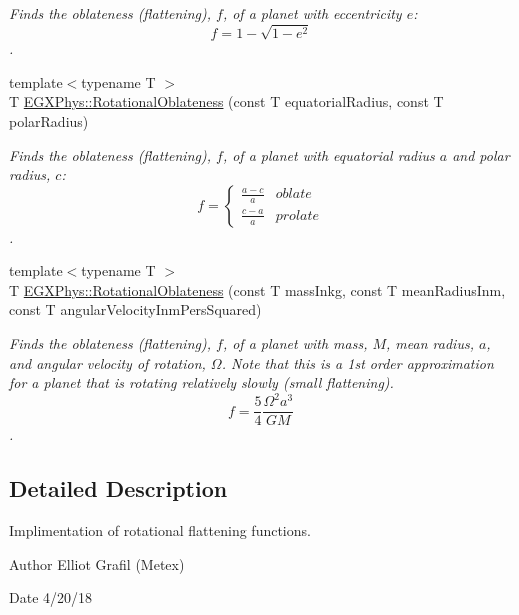 \begin{DoxyCompactItemize}
\begin{DoxyCompactList}\small\item\em Finds the oblateness (flattening), $f$, of a planet with eccentricity $e$\+: \[ f = 1 - \sqrt{1-e^2} \]. \end{DoxyCompactList}\item 
{\footnotesize template$<$typename T $>$ }\\T \mbox{\hyperlink{group___e_g_x_phys-_astrophysics-_rotational_flattening_ga0bbe606845430e58be5ed34541835f83}{E\+G\+X\+Phys\+::\+Rotational\+Oblateness}} (const T equatorial\+Radius, const T polar\+Radius)
\begin{DoxyCompactList}\small\item\em Finds the oblateness (flattening), $f$, of a planet with equatorial radius $a$ and polar radius, $c$\+: \[ f =\begin{cases} \frac{a-c}{a}{} & oblate \\ \frac{c-a}{a} & prolate \end{cases} \]. \end{DoxyCompactList}\item 
{\footnotesize template$<$typename T $>$ }\\T \mbox{\hyperlink{group___e_g_x_phys-_astrophysics-_rotational_flattening_ga7d78d01c8b3e1a9b2e4f17cb67969a88}{E\+G\+X\+Phys\+::\+Rotational\+Oblateness}} (const T mass\+Inkg, const T mean\+Radius\+Inm, const T angular\+Velocity\+Inm\+Pers\+Squared)
\begin{DoxyCompactList}\small\item\em Finds the oblateness (flattening), $f$, of a planet with mass, $M$, mean radius, $a$, and angular velocity of rotation, $\Omega$. Note that this is a 1st order approximation for a planet that is rotating relatively slowly (small flattening). \[ f = \frac{5}{4} \frac{\Omega^2 a^3}{GM} \]. \end{DoxyCompactList}\end{DoxyCompactItemize}


\subsection{Detailed Description}
Implimentation of rotational flattening functions. 

\begin{DoxyAuthor}{Author}
Elliot Grafil (Metex) 
\end{DoxyAuthor}
\begin{DoxyDate}{Date}
4/20/18 
\end{DoxyDate}
